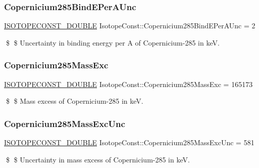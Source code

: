 \subsubsection{\texorpdfstring{Copernicium285\+Bind\+E\+Per\+A\+Unc}{Copernicium285BindEPerAUnc}}
{\footnotesize\ttfamily \mbox{\hyperlink{group___isotope_const-_macros_ga8f45a7272ce02c0b4c65c44636ed719a}{I\+S\+O\+T\+O\+P\+E\+C\+O\+N\+S\+T\+\_\+\+D\+O\+U\+B\+LE}} Isotope\+Const\+::\+Copernicium285\+Bind\+E\+Per\+A\+Unc = 2}

\$ \$ Uncertainty in binding energy per A of Copernicium-\/285 in keV. \mbox{\label{group___isotope_const-_copernicium-_cn285_gaca9865d2d5dc963693549bd1607f393f}} 
\subsubsection{\texorpdfstring{Copernicium285\+Mass\+Exc}{Copernicium285MassExc}}
{\footnotesize\ttfamily \mbox{\hyperlink{group___isotope_const-_macros_ga8f45a7272ce02c0b4c65c44636ed719a}{I\+S\+O\+T\+O\+P\+E\+C\+O\+N\+S\+T\+\_\+\+D\+O\+U\+B\+LE}} Isotope\+Const\+::\+Copernicium285\+Mass\+Exc = 165173}

\$ \$ Mass excess of Copernicium-\/285 in keV. \mbox{\label{group___isotope_const-_copernicium-_cn285_ga5920cc922726d05f5a8c16dc0ef7f347}} 
\subsubsection{\texorpdfstring{Copernicium285\+Mass\+Exc\+Unc}{Copernicium285MassExcUnc}}
{\footnotesize\ttfamily \mbox{\hyperlink{group___isotope_const-_macros_ga8f45a7272ce02c0b4c65c44636ed719a}{I\+S\+O\+T\+O\+P\+E\+C\+O\+N\+S\+T\+\_\+\+D\+O\+U\+B\+LE}} Isotope\+Const\+::\+Copernicium285\+Mass\+Exc\+Unc = 581}

\$ \$ Uncertainty in mass excess of Copernicium-\/285 in keV. \mbox{\label{group___isotope_const-_copernicium-_cn285_ga68dd279f30384eee42067f401f6214ca}} 
